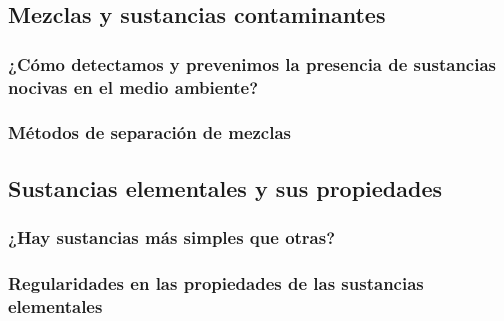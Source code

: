 \documentclass[11pt]{book}
\begin{document}
\newpage \thispagestyle{plain}
\section{Mezclas y sustancias contaminantes}
\subsection{¿Cómo detectamos y prevenimos la presencia de sustancias nocivas en el medio ambiente?}

\subsection{Métodos de separación de mezclas}

\newpage \thispagestyle{plain}
\section{Sustancias elementales y sus propiedades}
\subsection{¿Hay sustancias más simples que otras?}
\subsection{Regularidades en las propiedades de las sustancias elementales}

\newpage
\chapter{}
\newpage \thispagestyle{plain}
\end{document}
